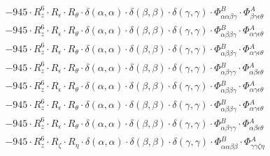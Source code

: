 \documentclass{article}
\begin{document}
\begin{subequations}
\begin{gather}
\begin{array}{c}
 \\[0.2em] 		 - 945 \cdot R_{z}^{6} \cdot R_{\epsilon{}} \cdot R_{\theta{}} \cdot \delta{}\left(\alpha{}, \alpha{}\right) \cdot \delta{}\left(\beta{}, \beta{}\right) \cdot \delta{}\left(\gamma{}, \gamma{}\right) \cdot \Phi{}^{B}_{\alpha{}\alpha{}\beta{}\gamma{}} \cdot \Phi{}^{A}_{\beta{}\gamma{}\epsilon{}\theta{}} 
 \\[0.2em] 		 - 945 \cdot R_{z}^{6} \cdot R_{\epsilon{}} \cdot R_{\theta{}} \cdot \delta{}\left(\alpha{}, \alpha{}\right) \cdot \delta{}\left(\beta{}, \beta{}\right) \cdot \delta{}\left(\gamma{}, \gamma{}\right) \cdot \Phi{}^{B}_{\alpha{}\beta{}\beta{}\gamma{}} \cdot \Phi{}^{A}_{\alpha{}\gamma{}\epsilon{}\theta{}} 
 \\[0.2em] 		 - 945 \cdot R_{z}^{6} \cdot R_{\epsilon{}} \cdot R_{\theta{}} \cdot \delta{}\left(\alpha{}, \alpha{}\right) \cdot \delta{}\left(\beta{}, \beta{}\right) \cdot \delta{}\left(\gamma{}, \gamma{}\right) \cdot \Phi{}^{B}_{\alpha{}\beta{}\beta{}\gamma{}} \cdot \Phi{}^{A}_{\alpha{}\gamma{}\epsilon{}\theta{}} 
 \\[0.2em] 		 - 945 \cdot R_{z}^{6} \cdot R_{\epsilon{}} \cdot R_{\theta{}} \cdot \delta{}\left(\alpha{}, \alpha{}\right) \cdot \delta{}\left(\beta{}, \beta{}\right) \cdot \delta{}\left(\gamma{}, \gamma{}\right) \cdot \Phi{}^{B}_{\alpha{}\beta{}\gamma{}\gamma{}} \cdot \Phi{}^{A}_{\alpha{}\beta{}\epsilon{}\theta{}} 
 \\[0.2em] 		 - 945 \cdot R_{z}^{6} \cdot R_{\epsilon{}} \cdot R_{\theta{}} \cdot \delta{}\left(\alpha{}, \alpha{}\right) \cdot \delta{}\left(\beta{}, \beta{}\right) \cdot \delta{}\left(\gamma{}, \gamma{}\right) \cdot \Phi{}^{B}_{\alpha{}\beta{}\beta{}\gamma{}} \cdot \Phi{}^{A}_{\alpha{}\gamma{}\epsilon{}\theta{}} 
 \\[0.2em] 		 - 945 \cdot R_{z}^{6} \cdot R_{\epsilon{}} \cdot R_{\theta{}} \cdot \delta{}\left(\alpha{}, \alpha{}\right) \cdot \delta{}\left(\beta{}, \beta{}\right) \cdot \delta{}\left(\gamma{}, \gamma{}\right) \cdot \Phi{}^{B}_{\alpha{}\beta{}\beta{}\gamma{}} \cdot \Phi{}^{A}_{\alpha{}\gamma{}\epsilon{}\theta{}} 
 \\[0.2em] 		 - 945 \cdot R_{z}^{6} \cdot R_{\epsilon{}} \cdot R_{\theta{}} \cdot \delta{}\left(\alpha{}, \alpha{}\right) \cdot \delta{}\left(\beta{}, \beta{}\right) \cdot \delta{}\left(\gamma{}, \gamma{}\right) \cdot \Phi{}^{B}_{\alpha{}\beta{}\gamma{}\gamma{}} \cdot \Phi{}^{A}_{\alpha{}\beta{}\epsilon{}\theta{}} 
 \\[0.2em] 		 - 945 \cdot R_{z}^{6} \cdot R_{\zeta{}} \cdot R_{\eta{}} \cdot \delta{}\left(\alpha{}, \alpha{}\right) \cdot \delta{}\left(\beta{}, \beta{}\right) \cdot \delta{}\left(\gamma{}, \gamma{}\right) \cdot \Phi{}^{B}_{\alpha{}\alpha{}\beta{}\beta{}} \cdot \Phi{}^{A}_{\gamma{}\gamma{}\zeta{}\eta{}} 

\end{array}
\end{gather}
\end{subequations}
\end{document}
